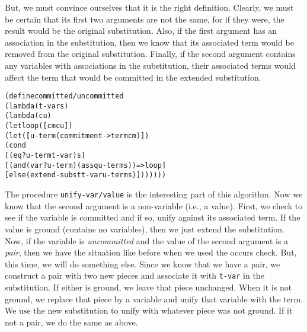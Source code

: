 But, we must convince ourselves that it is the right definition.
Clearly, we must be certain that its first two arguments are not the
same, for if they were, the result would be the original substitution.
Also, if the first argument has an association in the substitution,
then we know that its associated term would be removed from the
original substitution.  Finally, if the second argument contains any
variables with associations in the substitution, their associated
terms would affect the term that would be committed in the extended
substitution.
\begin{alltt}
(define committed/uncommitted
  (lambda (t-var s)
    (lambda (cu)
      (let loop ([cm cu])
        (let ([u-term (commitment->term cm)])
          (cond
            [(eq? u-term t-var) s]
            [(and (var? u-term) (assq u-term s)) => loop]
            [else (extend-subst t-var u-term s)]))))))
\end{alltt}
The procedure \texttt{unify-var/value} is the interesting part of this
algorithm.  Now we know that the second argument is a non-variable
(i.e., a value).  First, we check to see if the variable is committed
and if so, unify against its associated term. If the value is ground
(contains no variables), then we just extend the substitution.  Now,
if the variable is \emph{uncommitted} and the value of the second
argument is a \emph{pair}, then we have the situation like before when
we used the occurs check.  But, this time, we will do something else.
Since we know that we have a pair, we construct a pair with two new
pieces and associate it with \texttt{t-var} in the substitution.  If
either is ground, we leave that piece unchanged.  When it is not
ground, we replace that piece by a variable and unify that variable
with the term.  We use the new substitution to unify with whatever
piece was not ground.  If it not a pair, we do the same as above.

